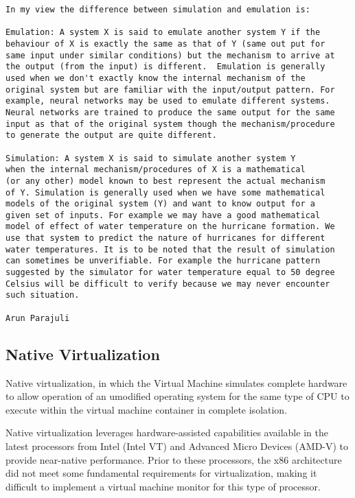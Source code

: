 \begin{verbatim}
In my view the difference between simulation and emulation is:

Emulation: A system X is said to emulate another system Y if the
behaviour of X is exactly the same as that of Y (same out put for
same input under similar conditions) but the mechanism to arrive at
the output (from the input) is different.  Emulation is generally
used when we don't exactly know the internal mechanism of the
original system but are familiar with the input/output pattern. For
example, neural networks may be used to emulate different systems.
Neural networks are trained to produce the same output for the same
input as that of the original system though the mechanism/procedure
to generate the output are quite different.

Simulation: A system X is said to simulate another system Y
when the internal mechanism/procedures of X is a mathematical
(or any other) model known to best represent the actual mechanism
of Y. Simulation is generally used when we have some mathematical
models of the original system (Y) and want to know output for a
given set of inputs. For example we may have a good mathematical
model of effect of water temperature on the hurricane formation. We
use that system to predict the nature of hurricanes for different
water temperatures. It is to be noted that the result of simulation
can sometimes be unverifiable. For example the hurricane pattern
suggested by the simulator for water temperature equal to 50 degree
Celsius will be difficult to verify because we may never encounter
such situation.

Arun Parajuli
\end{verbatim}


\subsection{Native Virtualization}

Native virtualization, in which the Virtual Machine simulates complete hardware
to allow operation of an umodified operating system for the same type of CPU to
execute within the virtual machine container in complete isolation.

Native virtualization leverages hardware-assisted capabilities available in the
latest processors from Intel (Intel VT) and Advanced Micro Devices (AMD-V) to
provide near-native performance. Prior to these processors, the x86
architecture did not meet some fundamental requirements for virtualization,
making it difficult to implement a virtual machine monitor for this type of
processor.

